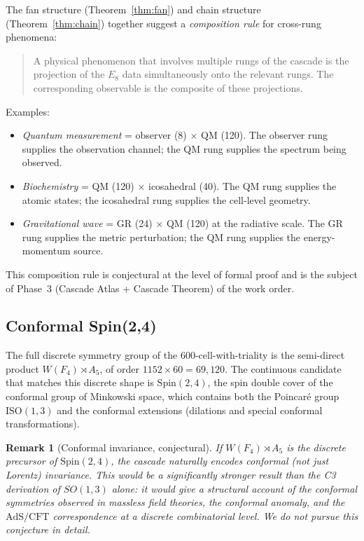 \documentclass[12pt]{article}
\newtheorem{remark}[theorem]{Remark}
\begin{document}
The fan structure (Theorem~\ref{thm:fan}) and chain structure (Theorem~\ref{thm:chain}) together suggest a \emph{composition rule} for cross-rung phenomena:

\begin{quote}
A physical phenomenon that involves multiple rungs of the cascade is the projection of the $E_8$ data simultaneously onto the relevant rungs. The corresponding observable is the composite of these projections.
\end{quote}

Examples:
\begin{itemize}
    \item \emph{Quantum measurement} = observer (8) $\times$ QM (120). The observer rung supplies the observation channel; the QM rung supplies the spectrum being observed.
    \item \emph{Biochemistry} = QM (120) $\times$ icosahedral (40). The QM rung supplies the atomic states; the icosahedral rung supplies the cell-level geometry.
    \item \emph{Gravitational wave} = GR (24) $\times$ QM (120) at the radiative scale. The GR rung supplies the metric perturbation; the QM rung supplies the energy-momentum source.
\end{itemize}

This composition rule is conjectural at the level of formal proof and is the subject of Phase~3 (Cascade Atlas + Cascade Theorem) of the work order.

\subsection{Conformal Spin(2,4)}

The full discrete symmetry group of the 600-cell-with-triality is the semi-direct product $W(F_4) \rtimes A_5$, of order $1152 \times 60 = 69{,}120$. The continuous candidate that matches this discrete shape is $\mathrm{Spin}(2, 4)$, the spin double cover of the conformal group of Minkowski space, which contains both the Poincar\'e group $\mathrm{ISO}(1,3)$ and the conformal extensions (dilations and special conformal transformations).

\begin{remark}[Conformal invariance, conjectural]\label{rmk:conformal}
If $W(F_4) \rtimes A_5$ is the discrete precursor of $\mathrm{Spin}(2, 4)$, the cascade naturally encodes \emph{conformal} (not just Lorentz) invariance. This would be a significantly stronger result than the C3 derivation of $SO(1, 3)$ alone: it would give a structural account of the conformal symmetries observed in massless field theories, the conformal anomaly, and the $\mathrm{AdS}/\mathrm{CFT}$ correspondence at a discrete combinatorial level. We do not pursue this conjecture in detail.
\end{remark}
\end{document}
